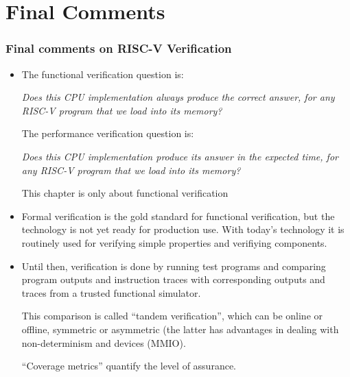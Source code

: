 
\section{Final Comments}

\begin{frame}[fragile]
\frametitle{Final comments on RISC-V Verification}

\footnotesize

\begin{itemize}

  \item The functional verification question is:

        \hmm
        \begin{minipage}{0.9\textwidth}
            \emph{Does this CPU implementation always produce the
            correct answer, for any RISC-V program that we load into
            its memory?}
        \end{minipage}

        \vx

        The performance verification question is:

        \hmm
        \begin{minipage}{0.9\textwidth}

            \emph{Does this CPU implementation produce its answer in
            the expected time, for any RISC-V program that we load
            into its memory?}

        \end{minipage}

        \vx

        This chapter is only about functional verification

  \vx

  \item Formal verification is the gold standard for functional
        verification, but the technology is not yet ready for
        production use.  With today's technology it is routinely used
        for verifying simple properties and verifiying components.

  \vx

  \item Until then, verification is done by running test programs and
        comparing program outputs and instruction traces with
        corresponding outputs and traces from a trusted functional
        simulator.

        \vx

        This comparison is called ``tandem verification'', which can
        be online or offline, symmetric or asymmetric (the latter has
        advantages in dealing with non-determinism and devices (MMIO).

        \vx

        ``Coverage metrics'' quantify the level of assurance.
\end{itemize}

\end{frame}







